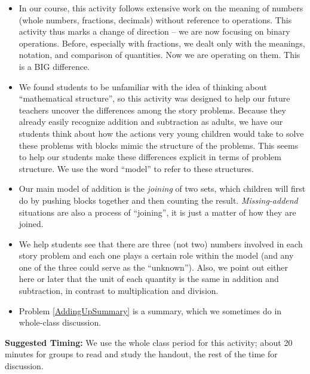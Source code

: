 \documentclass{ximera}
\begin{document}
\begin{instructorNotes}
\begin{itemize}
	\item In our course, this activity follows extensive work on the meaning of numbers (whole numbers, fractions, decimals) without reference to operations.  This activity thus marks a change of direction -- we are now focusing on binary operations. Before, especially with fractions, we dealt only with the meanings, notation, and comparison of quantities.  Now we are operating on them. This is a BIG difference.
	\item We found students to be unfamiliar with the idea of thinking about ``mathematical structure'', so this activity was designed to	help our future teachers uncover the differences among the story problems.  Because they already easily recognize addition and subtraction as adults, we have our students think about how the actions very young children would take to solve these problems with blocks mimic the structure of the problems. This seems to help our students make these differences explicit in terms of problem structure.  We use the word ``model'' to refer to these structures.
	\item Our main model of addition is the {\em joining} of two sets, which children will first do by pushing blocks together and then counting the result.  {\em Missing-addend} situations are also a process of ``joining'', it is just a matter of how they are joined.
	\item We help students see that there are three (not two) numbers involved in each story problem and each one plays a certain role within the model (and any one of the three could serve as the ``unknown'').  Also, we point out either here or later that the unit of each quantity is the same in addition and subtraction, in contrast to multiplication and division.
	\item Problem \ref{AddingUpSummary} is a summary, which we sometimes do in whole-class discussion.
\end{itemize}

{\bf Suggested Timing:} We use the whole class period for this activity; about 20 minutes for groups to read and study the handout, the rest of the time for discussion. 
\end{instructorNotes}
\end{document}
